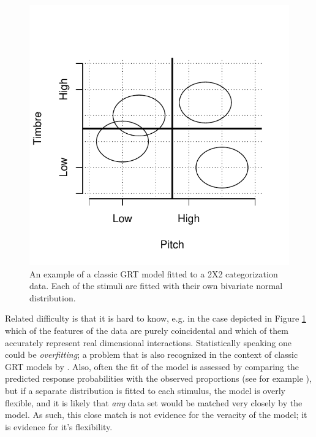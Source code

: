 \documentclass{article}\usepackage{knitr}
\begin{document}
\begin{figure}[!htb]
\centering
\begin{knitrout}
\color{fgcolor}
\includegraphics[width=\maxwidth]{figure/unnamed-chunk-11-1} 

\end{knitrout}
\caption{An example of a classic GRT model fitted to a 2X2 categorization data. Each of the stimuli are fitted with their own bivariate normal distribution.}
\label{fig:classicGRT}
\end{figure} 

Related difficulty is that it is hard to know, e.g. in the case depicted in Figure \ref{fig:classicGRT} which of the features of the data are purely coincidental and which of them accurately represent real dimensional interactions. Statistically speaking one could be \textit{overfitting}; a problem that is also recognized in the context of classic GRT models by \cite{soto2017}. Also, often the fit of the model is assessed by comparing the predicted response probabilities with the observed proportions (see for example \citet[Figure 4]{silbert2009}), but if a separate distribution is fitted to each stimulus, the model is overly flexible, and it is likely that \textit{any} data set would be matched very closely by the model. As such, this close match is not evidence for the veracity of the model; it is evidence for it's flexibility.
\end{document}
